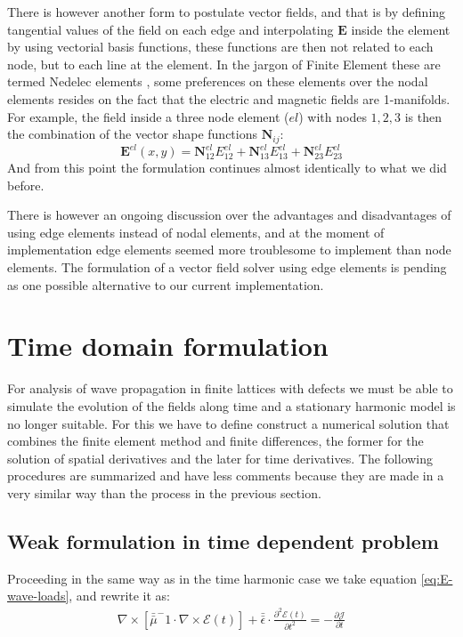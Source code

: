 There is  however another form to postulate vector fields, and that is by defining tangential values of the field on each edge and interpolating $\mathbf{E}$ inside the element by using vectorial basis functions, these functions are then not related to each node, but to each line at the element.  In the jargon of Finite Element these are termed Nedelec elements \cite{nedelec1980, kikuchi2001}, some preferences on these elements over the nodal elements resides on the fact that the electric and magnetic fields are 1-manifolds. For example, the field inside  a three node element ($el$) with nodes $1,2,3$ is then the combination of the vector shape functions $\mathbf{N}_{ij}$:
\begin{equation}
\mathbf{E}^{el}(x,y) =\mathbf{N}_{12}^{el}E_{12}^{el} + \mathbf{N}_{13}^{el}E_{13}^{el}+ \mathbf{N}_{23}^{el}E_{23}^{el}
\end{equation}
And from this point the formulation continues almost identically to what we did before.

There is however an ongoing discussion \cite{Mur1994, Webb1993, Gerr1998} over the advantages and disadvantages of using edge elements instead of nodal elements, and at the moment of implementation edge elements seemed more troublesome to implement than node elements. The formulation of a vector field solver using edge elements is pending as one possible alternative to our current implementation.

\section{Time domain formulation}
For analysis of wave propagation in finite lattices with defects we must be able to simulate the evolution of the fields along time and a stationary harmonic model is no longer suitable. For this we have to define construct a numerical solution that combines the finite element method and finite differences, the former for the solution of spatial derivatives and the later for time derivatives.
The following procedures are summarized and have less comments because they are made in a very similar way than the process in the previous section.

\subsection{Weak formulation in time dependent problem}
Proceeding in the same way as in the time harmonic case we take equation
\ref{eq:E-wave-loads}, and rewrite it as:
\begin{align}
\nabla\times\left[\bar{\bar{\mu}}^-1\cdot\nabla \times\mathcal{E}(t)\right] + \bar{\bar{\epsilon}}\cdot\frac{\partial^2 \mathcal{E}(t)}{\partial t^2}=-\frac{\partial \mathcal{J}}{\partial t} 
\end{align}

